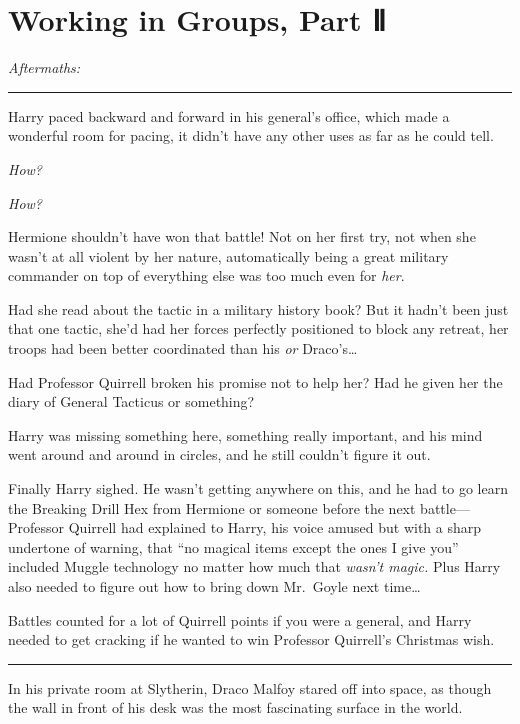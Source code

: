 \chapter{Working in Groups, Part Ⅱ}\label{working-in-groups-part}

\emph{Aftermaths:}

\begin{center}\rule{3in}{0.4pt}\end{center}

Harry paced backward and forward in his general's office, which made a
wonderful room for pacing, it didn't have any other uses as far as he
could tell.

\emph{How?}

\emph{How?}

Hermione shouldn't have won that battle! Not on her first try, not when
she wasn't at all violent by her nature, automatically being a great
military commander on top of everything else was too much even for
\emph{her}.

Had she read about the tactic in a military history book? But it hadn't
been just that one tactic, she'd had her forces perfectly positioned to
block any retreat, her troops had been better coordinated than his
\emph{or} Draco's\ldots{}

Had Professor Quirrell broken his promise not to help her? Had he given
her the diary of General Tacticus or something?

Harry was missing something here, something really important, and his
mind went around and around in circles, and he still couldn't figure it
out.

Finally Harry sighed. He wasn't getting anywhere on this, and he had to
go learn the Breaking Drill Hex from Hermione or someone before the next
battle---Professor Quirrell had explained to Harry, his voice amused but
with a sharp undertone of warning, that ``no magical items except the
ones I give you'' included Muggle technology no matter how much that
\emph{wasn't magic.} Plus Harry also needed to figure out how to bring
down Mr.~Goyle next time\ldots{}

Battles counted for a lot of Quirrell points if you were a general, and
Harry needed to get cracking if he wanted to win Professor Quirrell's
Christmas wish.

\begin{center}\rule{3in}{0.4pt}\end{center}

In his private room at Slytherin, Draco Malfoy stared off into space, as
though the wall in front of his desk was the most fascinating surface in
the world.

